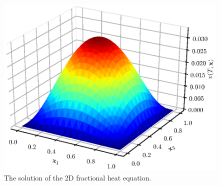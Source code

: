 \begin{figure}[h]
\centering
  \includegraphics[width=0.8\linewidth]{figures/3d.eps}
  \caption{The solution of the 2D fractional heat equation.}
  \label{fig::md}
\end{figure}
